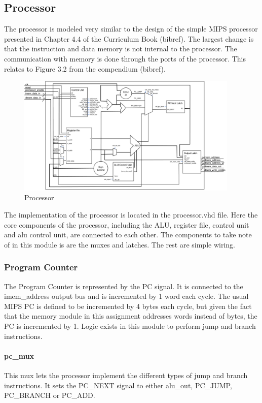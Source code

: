 \subsection{Processor}

The processor is modeled very similar to the design of the simple MIPS processor presented in Chapter 4.4 of the Curriculum Book (bibref). The largest change is that the instruction and data memory is not internal to the processor. The communication with memory is done through the ports of the processor. This relates to Figure 3.2 from the compendium (bibref). 

\begin{figure}[h]
	\includegraphics[width=400px]{figures/processor.png}
	\caption{Processor}
\end{figure}

The implementation of the processor is located in the processor.vhd file. Here the core components of the processor, including the ALU, register file, control unit and alu control unit, are connected to each other. The components to take note of in this module is are the muxes and latches. The rest are simple wiring. 

\subsubsection{Program Counter}
The Program Counter is represented by the PC signal. It is connected to the imem\_address output bus and is incremented by 1 word each cycle. The usual MIPS PC is defined to be incremented by 4 bytes each cycle, but given the fact that the memory module in this assignment addresses words instead of bytes, the PC is incremented by 1. Logic exists in this module to perform jump and branch instructions. 

\paragraph{pc\_mux} This mux lets the processor implement the different types of jump and branch instructions. It sets the PC\_NEXT signal to either alu\_out, PC\_JUMP, PC\_BRANCH or PC\_ADD. 

